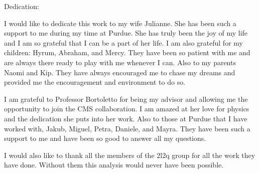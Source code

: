 %
%
%
%
%

\begin{dedication}
Dedication:

I would like to dedicate this work to my wife Julianne.  She has been such a support to me during my time at Purdue.  She has truly been the joy of my life and I am so grateful that I can be a part of her life.  I am also grateful for my children: Hyrum, Abraham, and Mercy.  They have been so patient with me and are always there ready to play with me whenever I can. Also to my parents Naomi and Kip.  They have always encouraged me to chase my dreams and provided me the encouragement and environment to do so.

I am grateful to Professor Bortoletto for being my advisor and allowing me the opportunity to join the CMS collaboration.  I am amazed at her love for physics and the dedication she puts into her work.  Also to those at Purdue that I have worked with, Jakub, Miguel, Petra, Daniele, and Mayra.  They have been such a support to me and have been so good to answer all my questions.

I would also like to thank all the members of the 2l2q group for all the work they have done.  Without them this analysis would never have been possible.


\end{dedication}



